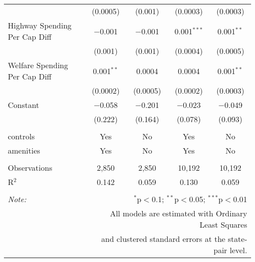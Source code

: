 \begin{table}[!htbp]
\begin{tabular}{@{\extracolsep{5pt}}lcccc}
  & (0.0005) & (0.001) & (0.0003) & (0.0003) \\ 
  Highway Spending Per Cap Diff & $-$0.001 & $-$0.001 & 0.001$^{***}$ & 0.001$^{**}$ \\ 
  & (0.001) & (0.001) & (0.0004) & (0.0005) \\ 
  Welfare Spending Per Cap Diff & 0.001$^{**}$ & 0.0004 & 0.0004 & 0.001$^{**}$ \\ 
  & (0.0002) & (0.0005) & (0.0002) & (0.0003) \\ 
  Constant & $-$0.058 & $-$0.201 & $-$0.023 & $-$0.049 \\ 
  & (0.222) & (0.164) & (0.078) & (0.093) \\ 
 \hline \\[-1.8ex] 
controls & Yes & No & Yes & No \\ 
amenities & Yes & No & Yes & No \\ 
\hline \\[-1.8ex] 
Observations & 2,850 & 2,850 & 10,192 & 10,192 \\ 
R$^{2}$ & 0.142 & 0.059 & 0.130 & 0.059 \\ 
\hline 
\hline \\[-1.8ex] 
\textit{Note:}  & \multicolumn{4}{r}{$^{*}$p$<$0.1; $^{**}$p$<$0.05; $^{***}$p$<$0.01} \\ 
 & \multicolumn{4}{r}{All models are estimated with Ordinary Least Squares} \\ 
 & \multicolumn{4}{r}{and clustered standard errors at the state-pair level.} \\ 
\end{tabular} 
\end{table} 
